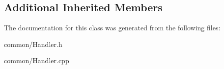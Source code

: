 \subsection*{Additional Inherited Members}


The documentation for this class was generated from the following files\+:\begin{DoxyCompactItemize}
\item 
common/Handler.\+h\item 
common/Handler.\+cpp\end{DoxyCompactItemize}
